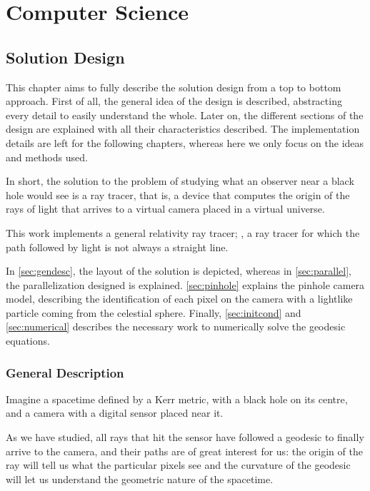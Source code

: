 \chapter{Computer Science}
\label{chapter:computer-science}

\section{Solution Design}
\label{chapter:design}

This chapter aims to fully describe the solution design from a top to bottom approach. First of all, the general idea of the design is described, abstracting every detail to easily understand the whole. Later on, the different sections of the design are explained with all their characteristics described. The implementation details are left for the following chapters, whereas here we only focus on the ideas and methods used.

In short, the solution to the problem of studying what an observer near a black hole would see is a ray tracer, that is, a device that computes the origin of the rays of light that arrives to a virtual camera placed in a virtual universe.

This work implements a general relativity ray tracer; \ie, a ray tracer for which the path followed by light is not always a straight line.

In \autoref{sec:gendesc}, the layout of the solution is depicted, whereas in \autoref{sec:parallel}, the parallelization designed is explained. \autoref{sec:pinhole} explains the pinhole camera model, describing the identification of each pixel on the camera with a lightlike particle coming from the celestial sphere. Finally, \autoref{sec:initcond} and \autoref{sec:numerical} describes the necessary work to numerically solve the geodesic equations.

\subsection{General Description}
\label{sec:gendesc}

Imagine a spacetime defined by a Kerr metric, with a black hole on its centre, and a camera with a digital sensor placed near it.

As we have studied, all rays that hit the sensor have followed a geodesic to finally arrive to the camera, and their paths are of great interest for us: the origin of the ray will tell us what the particular pixels see and the curvature of the geodesic will let us understand the geometric nature of the spacetime.

